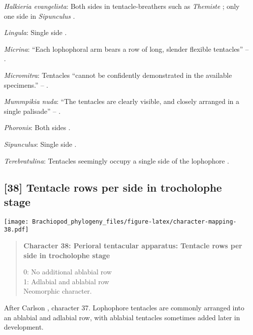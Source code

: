 \documentclass[openany]{book}
\theoremstyle{definition}
\theoremstyle{definition}
\theoremstyle{definition}
\theoremstyle{remark}
\begin{document}
\hypertarget{Halkieria_evangelista-coding-37}{}
\emph{Halkieria evangelista}: Both sides in tentacle-breathers such as
\emph{Themiste} \citep{Ruppert1995, Adrianov2006}; only one side in
\emph{Sipunculus} \citep{Ruppert1995, Adrianov2006}.

\hypertarget{Lingula-coding-37}{}
\emph{Lingula}: Single side \citep{Nielsen1966}.

\hypertarget{Micrina-coding-37}{}
\emph{Micrina}: ``Each lophophoral arm bears a row of long, slender
flexible tentacles'' -- \citet{Zhang2009Architectureand}.

\hypertarget{Micromitra-coding-37}{}
\emph{Micromitra}: Tentacles ``cannot be confidently demonstrated in the
available specimens.'' --
\citet{Zhang2007Rhynchonelliformeanbrachiopods}.

\hypertarget{Mummpikia_nuda-coding-37}{}
\emph{Mummpikia nuda}: ``The tentacles are clearly visible, and closely
arranged in a single palisade'' -- \citet{Zhang2004Newdata}.

\hypertarget{Phoronis-coding-37}{}
\emph{Phoronis}: Both sides \citep{Schwaha2015, Shunkina2015}.

\hypertarget{Sipunculus-coding-37}{}
\emph{Sipunculus}: Single side \citep{Temereva2016Thenervous}.

\hypertarget{Terebratulina-coding-37}{}
\emph{Terebratulina}: Tentacles seemingly occupy a single side of the
lophophore \citep{Zhang2013}.

\subsection*{{[}38{]} Tentacle rows per side in trocholophe
stage}\label{tentacle-rows-per-side-in-trocholophe-stage}

\texttt{[image: Brachiopod\_phylogeny\_files/figure-latex/character-mapping-38.pdf]}

\begin{quote}
\textbf{Character 38: Perioral tentacular apparatus: Tentacle rows per
side in trocholophe stage}

0: No additional ablabial row\\
1: Adlabial and ablabial row\\
Neomorphic character.
\end{quote}

After Carlson \citeyearpar{Carlson1995Phylogeneticrelationships},
character 37. Lophophore tentacles are commonly arranged into an
ablabial and adlabial row, with ablabial tentacles sometimes added later
in development.
\end{document}
